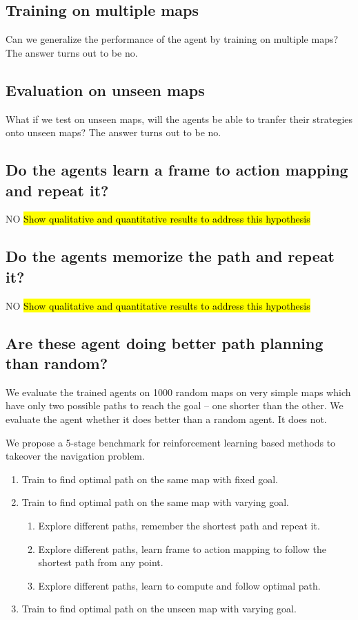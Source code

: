\subsection{Training on multiple maps}
Can we generalize the performance of the agent by training on multiple maps? The answer turns out to be no.

\subsection{Evaluation on unseen maps}
What if we test on unseen maps, will the agents be able to tranfer their strategies onto unseen maps? The answer turns out to be no.

\subsection{Do the agents learn a frame to action mapping and repeat it?}
NO
\hl{Show qualitative and quantitative results to address this hypothesis}

\subsection{Do the agents memorize the path and repeat it?}
NO
\hl{Show qualitative and quantitative results to address this hypothesis}

\subsection{Are these agent doing better path planning than random?}
We evaluate the trained agents on 1000 random maps on very simple maps which have only two possible paths to reach the goal -- one shorter than the other. We evaluate the agent whether it does better than a random agent.
It does not.

We propose a 5-stage benchmark for reinforcement learning based methods to takeover the navigation problem.
\begin{enumerate}
  \item Train to find optimal path on the same map with fixed goal.
  \item Train to find optimal path on the same map with varying goal. 
    \begin{enumerate}
    \item Explore different paths, remember the shortest path and repeat it.
    \item Explore different paths, learn frame to action mapping to follow the shortest path from any point.
    \item Explore different paths, learn to compute and follow optimal path.
    \end{enumerate}
  \item Train to find optimal path on the unseen map with varying goal. 
\end{enumerate}

